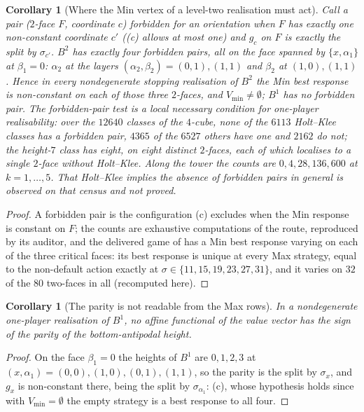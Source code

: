 \documentclass[11pt]{article}
\theoremstyle{plain}
\newtheorem{corollary}[theorem]{Corollary}
\theoremstyle{definition}
\newcommand{\Vmin}{V_{\min}}
\begin{document}
\begin{corollary}[Where the Min vertex of a level-two realisation must act]\label{cor:b2-min}
Call a pair ($2$-face $F$, coordinate $c$) \emph{forbidden} for an
orientation when $F$ has exactly one non-constant coordinate $c'$
((c) allows at most one) and $g_c$ on $F$ is exactly
the split by $\sigma_{c'}$. $B^{2}$ has exactly four forbidden pairs, all on the
face spanned by $\{x,\alpha_1\}$ at $\beta_1=0$: $\alpha_2$ at the layers
$(\alpha_2,\beta_2)=(0,1),(1,1)$ and $\beta_2$ at $(1,0),(1,1)$. Hence in
every nondegenerate stopping realisation of $B^{2}$ the Min best
response is non-constant on each of those three $2$-faces, and
$\Vmin\ne\emptyset$; $B^{1}$ has no forbidden pair. The forbidden-pair
test is a local necessary condition for one-player realisability: over
the $12640$ classes of the $4$-cube, none of the $6113$ Holt--Klee
classes has a forbidden pair, $4365$ of the $6527$ others have one and
$2162$ do not; the height-$7$ class has eight, on eight distinct
$2$-faces, each of which localises
 to a single $2$-face without Holt--Klee.
Along the tower the counts are $0,4,28,136,600$ at $k=1,\dots,5$. That
Holt--Klee implies the absence of forbidden pairs in general is observed
on that census and not proved.
\end{corollary}

\begin{proof}
A forbidden pair is the configuration (c) excludes
when the Min response is constant on $F$; the counts are exhaustive
computations of the route, reproduced by its auditor, and the delivered
game of  has a Min best response varying on each
of the three critical faces: its best response is unique at every Max
strategy, equal to the non-default action exactly at
$\sigma\in\{11,15,19,23,27,31\}$, and it varies on $32$ of the $80$
two-faces in all (recomputed here).
\end{proof}

\begin{corollary}[The parity is not readable from the Max rows]\label{cor:parity-unreadable}
In a nondegenerate one-player realisation of $B^{1}$, no affine
functional of the value vector has the sign of the parity of the
bottom-antipodal height.
\end{corollary}

\begin{proof}
On the face $\beta_1=0$ the heights of $B^{1}$ are $0,1,2,3$ at
$(x,\alpha_1)=(0,0),(1,0),(0,1),(1,1)$, so the parity is the split by
$\sigma_x$, and $g_x$ is non-constant there, being the split by
$\sigma_{\alpha_1}$: (c), whose hypothesis holds since
with $\Vmin=\emptyset$ the empty strategy is a best response to all four.
\end{proof}
\end{document}
